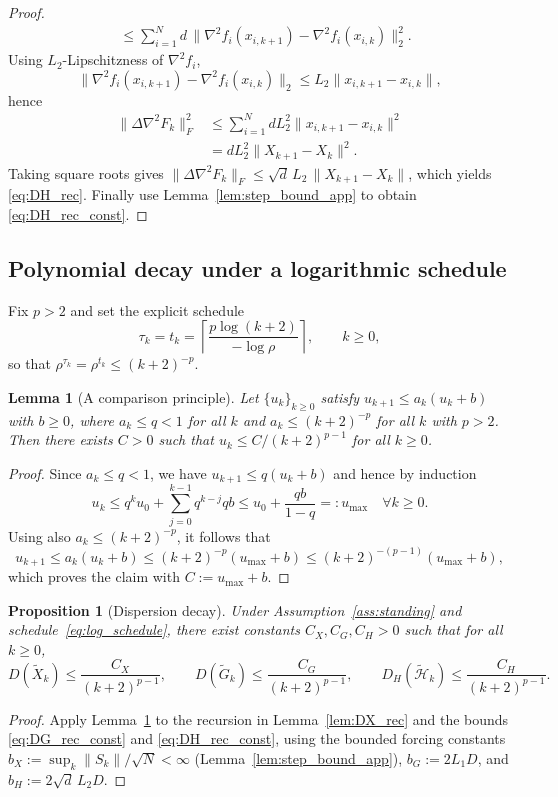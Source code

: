 \documentclass[11pt,a4paper]{article}
\newtheorem{lemma}[theorem]{Lemma}
\newtheorem{proposition}[theorem]{Proposition}
\begin{document}
\begin{proof}
\begin{align*}
&\le \textstyle\sum_{i=1}^N d\,\|\nabla^2 f_i(x_{i,k+1})\!-\!\nabla^2 f_i(x_{i,k})\|_2^2.
\end{align*}
Using $L_2$-Lipschitzness of $\nabla^2 f_i$,
\[
\|\nabla^2 f_i(x_{i,k+1})\!-\!\nabla^2 f_i(x_{i,k})\|_2\le L_2\|x_{i,k+1}\!-\!x_{i,k}\|,
\]
hence
\begin{align*}
\|\Delta\nabla^2 F_k\|_F^2
&\le \textstyle\sum_{i=1}^N d L_2^2\|x_{i,k+1}\!-\!x_{i,k}\|^2\\
&= dL_2^2\|X_{k+1}\!-\!X_k\|^2.
\end{align*}
Taking square roots gives $\|\Delta\nabla^2 F_k\|_F\le \sqrt d\,L_2\,\|X_{k+1}-X_k\|$,
which yields \eqref{eq:DH_rec}. Finally use Lemma~\ref{lem:step_bound_app} to obtain \eqref{eq:DH_rec_const}.
\end{proof}

\subsection{Polynomial decay under a logarithmic schedule}

Fix $p>2$ and set the explicit schedule
\begin{equation}\label{eq:log_schedule}
\tau_k=t_k=\left\lceil \frac{p\log(k+2)}{-\log\rho}\right\rceil,\qquad k\ge 0,
\end{equation}
so that $\rho^{\tau_k}=\rho^{t_k}\le (k+2)^{-p}$.

\begin{lemma}[A comparison principle]\label{lem:compare}
Let $\{u_k\}_{k\ge0}$ satisfy $u_{k+1}\le a_k(u_k+b)$ with $b\ge0$, where
$a_k\le q<1$ for all $k$ and $a_k\le (k+2)^{-p}$ for all $k$ with $p>2$.
Then there exists $C>0$ such that $u_k\le C/(k+2)^{p-1}$ for all $k\ge0$.
\end{lemma}
\begin{proof}
Since $a_k\le q<1$, we have $u_{k+1}\le q(u_k+b)$ and hence by induction
\[
u_k\le q^k u_0+\sum_{j=0}^{k-1} q^{k-j}qb \le u_0+\frac{qb}{1-q}=:u_{\max}\quad \forall k\ge 0.
\]
Using also $a_k\le (k+2)^{-p}$, it follows that
\[
u_{k+1}\le a_k(u_k+b)\le (k+2)^{-p}(u_{\max}+b)\le (k+2)^{-(p-1)}(u_{\max}+b),
\]
which proves the claim with $C:=u_{\max}+b$.
\end{proof}

\begin{proposition}[Dispersion decay]\label{prop:dispersion_decay}
Under Assumption~\ref{ass:standing} and schedule~\eqref{eq:log_schedule},
there exist constants $C_X,C_G,C_H>0$ such that for all $k\ge0$,
\[
D(\tilde X_k)\le \frac{C_X}{(k+2)^{p-1}},
\qquad
D(\tilde G_k)\le \frac{C_G}{(k+2)^{p-1}},
\qquad
D_H(\tilde{\mathcal H}_k)\le \frac{C_H}{(k+2)^{p-1}}.
\]
\end{proposition}
\begin{proof}
Apply Lemma~\ref{lem:compare} to the recursion in Lemma~\ref{lem:DX_rec} and the bounds \eqref{eq:DG_rec_const} and \eqref{eq:DH_rec_const},
using the bounded forcing constants $b_X:=\sup_k\|S_k\|/\sqrt N<\infty$ (Lemma~\ref{lem:step_bound_app}),
$b_G:=2L_1D$, and $b_H:=2\sqrt d\,L_2D$.
\end{proof}
\end{document}
